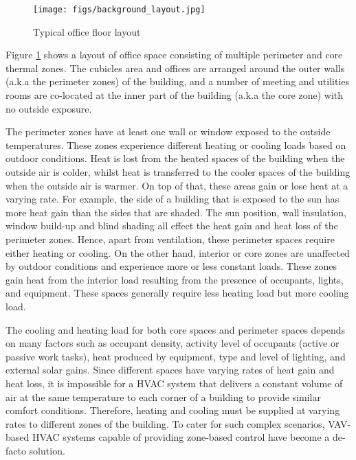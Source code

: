 \begin{figure}[t]
\centering
\texttt{[image: figs/background\_layout.jpg]}	
\caption{Typical office floor layout}
\label{fig:background:typical_hvac_zone}
\end{figure}

Figure \ref{fig:background:typical_hvac_zone} shows a layout of office space consisting of multiple perimeter and core thermal zones. %
The cubicles area and offices are arranged around the outer walls (a.k.a the perimeter zones) of the building, and a number of meeting and utilities rooms are co-located at the inner part of the building (a.k.a the core zone) with no outside exposure. %

The perimeter zones have at least one wall or window exposed to the outside temperatures. These zones experience different heating or cooling loads based on outdoor conditions. Heat is lost from the heated spaces of the building when the outside air is colder, whilst heat is transferred to the cooler spaces of the building when the outside air is warmer. On top of that, these areas gain or lose heat at a varying rate. For example, the side of a building that is exposed to the sun has more heat gain than the sides that are shaded. The sun position, wall insulation, window build-up and blind shading all effect the heat gain and heat loss of the perimeter zones. Hence, apart from ventilation, these perimeter spaces require either heating or cooling. On the other hand, interior or core zones are unaffected by outdoor conditions and experience more or less constant loads. These zones gain heat from the interior load resulting from the presence of occupants, lights, and equipment. These spaces generally require less heating load but more cooling load. 

The cooling and heating load for both core spaces and perimeter spaces depends on many factors such as occupant density, activity level of occupants (active or passive work tasks), heat produced by equipment, type and level of lighting, and external solar gains. Since different spaces have varying rates of heat gain and heat loss, it is impossible for a HVAC system that delivers a constant volume of air at the same temperature to each corner of a building to provide similar comfort conditions. Therefore, heating and cooling must be supplied at varying rates to different zones of the building. To cater for such complex scenarios, VAV-based HVAC systems capable of providing zone-based control have become a de-facto solution. 


